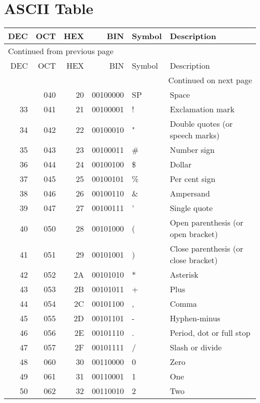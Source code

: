 \documentclass[11pt]{article}
\begin{document}
 \newpage

\section{ASCII Table}
\label{sec:org19cbcb3}

\begin{longtable}{rrrrll}
DEC & OCT & HEX & BIN & Symbol & Description\\[0pt]
\hline
\endfirsthead
\multicolumn{6}{l}{Continued from previous page} \\[0pt]
\hline

DEC & OCT & HEX & BIN & Symbol & Description \\[0pt]

\hline
\endhead
\hline\multicolumn{6}{r}{Continued on next page} \\
\endfoot
\endlastfoot
\hline
32 & 040 & 20 & 00100000 & SP & Space\\[0pt]
33 & 041 & 21 & 00100001 & ! & Exclamation mark\\[0pt]
34 & 042 & 22 & 00100010 & " & Double quotes (or speech marks)\\[0pt]
35 & 043 & 23 & 00100011 & \# & Number sign\\[0pt]
36 & 044 & 24 & 00100100 & \$ & Dollar\\[0pt]
37 & 045 & 25 & 00100101 & \% & Per cent sign\\[0pt]
38 & 046 & 26 & 00100110 & \& & Ampersand\\[0pt]
39 & 047 & 27 & 00100111 & ' & Single quote\\[0pt]
40 & 050 & 28 & 00101000 & ( & Open parenthesis (or open bracket)\\[0pt]
41 & 051 & 29 & 00101001 & ) & Close parenthesis (or close bracket)\\[0pt]
42 & 052 & 2A & 00101010 & * & Asterisk\\[0pt]
43 & 053 & 2B & 00101011 & + & Plus\\[0pt]
44 & 054 & 2C & 00101100 & , & Comma\\[0pt]
45 & 055 & 2D & 00101101 & - & Hyphen-minus\\[0pt]
46 & 056 & 2E & 00101110 & . & Period, dot or full stop\\[0pt]
47 & 057 & 2F & 00101111 & / & Slash or divide\\[0pt]
48 & 060 & 30 & 00110000 & 0 & Zero\\[0pt]
49 & 061 & 31 & 00110001 & 1 & One\\[0pt]
50 & 062 & 32 & 00110010 & 2 & Two\\[0pt]

\end{longtable}
\end{document}
